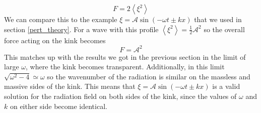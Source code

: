 \documentclass[11pt, oneside]{article}  	%
\numberwithin{equation}{section}
\begin{document}
\begin{equation}
F = 2\left \langle \xi^2 \right \rangle
\end{equation}
We can compare this to the example $\xi = \mathcal{A}\sin( - \omega t \pm k x)$ that we used in section \ref{pert_theory}. For a wave with this profile $ \left \langle \xi^2 \right \rangle = \frac{1}{2}\mathcal{A}^2$ so the overall force acting on the kink becomes
\begin{equation}
F = \mathcal{A}^2
\end{equation}
This matches up with the results we got in the previous section in the limit of large $\omega$, where the kink becomes transparent. Additionally, in this limit $\sqrt{\omega^2 - 4} \simeq \omega$ so the wavenumber of the radiation is similar on the massless and massive sides of the kink. This means that $\xi = \mathcal{A}\sin( - \omega t \pm k x)$ is a valid solution for the radiation field on both sides of the kink, since the values of $\omega$ and $k$ on either side become identical.
\end{document}
